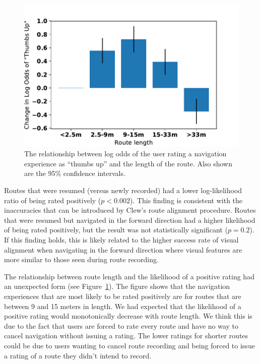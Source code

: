 \documentclass[chi]{sigchi}
\begin{document}
\begin{figure}
\includegraphics[width=\linewidth]{figures/routelength}
\caption{The relationship between log odds of the user rating a navigation experience as ``thumbs up'' and the length of the route.  Also shown are the 95\% confidence intervals.\label{fig:routelength}}
\end{figure}

Routes that were resumed (versus newly recorded) had a lower log-likelihood ratio of being rated positively ($p < 0.002$).  This finding is consistent with the inaccuracies that can be introduced by Clew's route alignment procedure.  Routes that were resumed but navigated in the forward direction had a higher likelihood of being rated positively, but the result was not statistically significant ($p = 0.2$). If this finding holds, this is likely related to the higher success rate of visual alignment when navigating in the forward direction where visual features are more similar to those seen during route recording.


The relationship between route length and the likelihood of a positive rating had an unexpected form (see Figure~\ref{fig:routelength}).  The figure shows that the navigation experiences that are most likely to be rated positively are for routes that are between 9 and 15 meters in length. We had expected that the likelihood of a positive rating would monotonically decrease with route length.  We think this is due to the fact that users are forced to rate every route and have no way to cancel navigation without issuing a rating.  The lower ratings for shorter routes could be due to users wanting to cancel route recording and being forced to issue a rating of a route they didn't intend to record.
\end{document}
